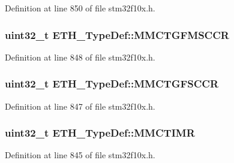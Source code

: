 Definition at line 850 of file stm32f10x.\+h.

\subsubsection[{\texorpdfstring{M\+M\+C\+T\+G\+F\+M\+S\+C\+CR}{MMCTGFMSCCR}}]{ {\bf uint32\+\_\+t} E\+T\+H\+\_\+\+Type\+Def\+::\+M\+M\+C\+T\+G\+F\+M\+S\+C\+CR}\hypertarget{struct_e_t_h___type_def_acec318669d03f140af4a760093411150}{}\label{struct_e_t_h___type_def_acec318669d03f140af4a760093411150}


Definition at line 848 of file stm32f10x.\+h.

\subsubsection[{\texorpdfstring{M\+M\+C\+T\+G\+F\+S\+C\+CR}{MMCTGFSCCR}}]{ {\bf uint32\+\_\+t} E\+T\+H\+\_\+\+Type\+Def\+::\+M\+M\+C\+T\+G\+F\+S\+C\+CR}\hypertarget{struct_e_t_h___type_def_a1b55806b0e28cc18316cb1b9350aab2c}{}\label{struct_e_t_h___type_def_a1b55806b0e28cc18316cb1b9350aab2c}


Definition at line 847 of file stm32f10x.\+h.

\subsubsection[{\texorpdfstring{M\+M\+C\+T\+I\+MR}{MMCTIMR}}]{ {\bf uint32\+\_\+t} E\+T\+H\+\_\+\+Type\+Def\+::\+M\+M\+C\+T\+I\+MR}\hypertarget{struct_e_t_h___type_def_acbe0f472d72f011c5903806d12c4e086}{}\label{struct_e_t_h___type_def_acbe0f472d72f011c5903806d12c4e086}


Definition at line 845 of file stm32f10x.\+h.

